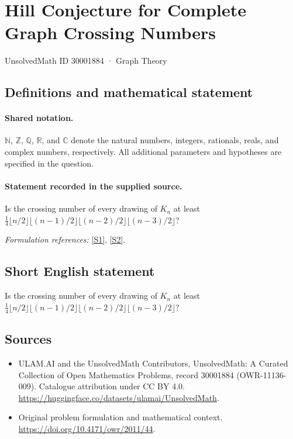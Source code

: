 \documentclass[11pt]{article}
\newcommand{\sref}[2]{\hyperlink{source:#1:#2}{[S#2]}}
\begin{document}
\setcounter{section}{30001883}
\section{Hill Conjecture for Complete Graph Crossing Numbers}\label{30001884}
{\small UnsolvedMath ID 30001884 · Graph Theory}
\subsection{Definitions and mathematical statement}

\paragraph{Shared notation.}$\mathbb N$, $\mathbb Z$, $\mathbb Q$, $\mathbb R$, and $\mathbb C$ denote the natural numbers, integers, rationals, reals, and complex numbers, respectively. All additional parameters and hypotheses are specified in the question.


\paragraph{Statement recorded in the supplied source.}
Is the crossing number of every drawing of $K_n$ at least $\frac14\lfloor n/2\rfloor\lfloor(n-1)/2\rfloor\lfloor(n-2)/2\rfloor\lfloor(n-3)/2\rfloor$?
\par\smallskip\textit{Formulation references:} \sref{30001884}{1}, \sref{30001884}{2}.
\subsection{Short English statement}
Is the crossing number of every drawing of $K_n$ at least $\frac14\lfloor n/2\rfloor\lfloor(n-1)/2\rfloor\lfloor(n-2)/2\rfloor\lfloor(n-3)/2\rfloor$?
\subsection{Sources}
\begin{itemize}
\item[\hypertarget{source:30001884:1}{S1}] ULAM.AI and the UnsolvedMath Contributors, UnsolvedMath: A Curated Collection of Open Mathematics Problems, record 30001884 (OWR-11136-009). Catalogue attribution under CC BY 4.0.
\url{https://huggingface.co/datasets/ulamai/UnsolvedMath}.
\item[\hypertarget{source:30001884:2}{S2}] Original problem formulation and mathematical context.
\url{https://doi.org/10.4171/owr/2011/44}.
\end{itemize}
\label{end:30001884}
\end{document}
